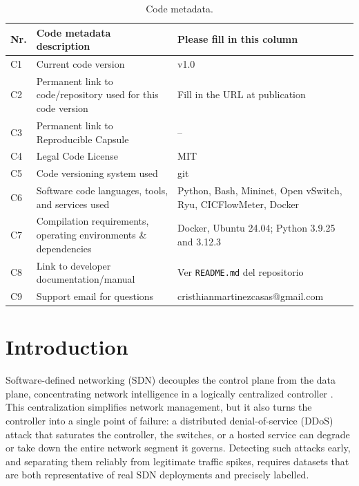 \documentclass[a4paper,fleqn]{cas-dc}
\begin{document}
\begin{table}[t]
\small
\caption{Code metadata.}\label{tbl:metadata}
\begin{tabular*}{\textwidth}{@{}p{1cm}p{6.5cm}L@{}}
\toprule
Nr. & Code metadata description & Please fill in this column \\
\midrule
C1 & Current code version & v1.0 \\
C2 & Permanent link to code/repository used for this code version & Fill in the URL at publication \\
C3 & Permanent link to Reproducible Capsule & -- \\
C4 & Legal Code License & MIT \\
C5 & Code versioning system used & git \\
C6 & Software code languages, tools, and services used & Python, Bash, Mininet, Open vSwitch, Ryu, CICFlowMeter, Docker \\
C7 & Compilation requirements, operating environments \& dependencies & Docker, Ubuntu 24.04; Python 3.9.25 and 3.12.3 \\
C8 & Link to developer documentation/manual & Ver \texttt{README.md} del repositorio \\
C9 & Support email for questions & cristhianmartinezcasas@gmail.com \\
\bottomrule
\end{tabular*}
\end{table}


\section{Introduction}\label{sec:intro}

Software-defined networking (SDN) decouples the control plane from
the data plane, concentrating network intelligence in a logically
centralized controller \citep{kreutz2015sdn}. This centralization
simplifies network management, but it also turns the controller into
a single point of failure: a distributed denial-of-service (DDoS)
attack that saturates the controller, the switches, or a hosted
service can degrade or take down the entire network segment it
governs. Detecting such attacks early, and separating them reliably
from legitimate traffic spikes, requires datasets that are both
representative of real SDN deployments and precisely labelled.
\end{document}
